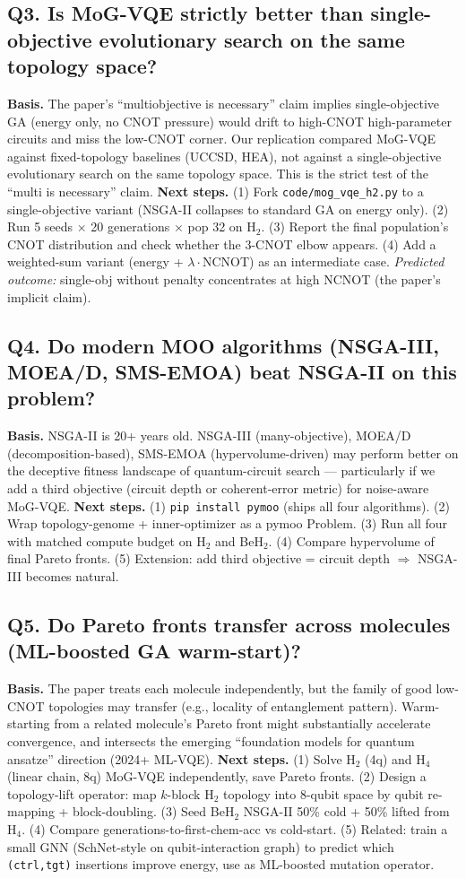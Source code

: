 \subsection*{Q3. Is MoG-VQE strictly better than single-objective evolutionary search on the same topology space?}
\textbf{Basis.} The paper's ``multiobjective is necessary'' claim implies single-objective
GA (energy only, no CNOT pressure) would drift to high-CNOT high-parameter circuits and miss
the low-CNOT corner. Our replication compared MoG-VQE against fixed-topology baselines
(UCCSD, HEA), not against a single-objective evolutionary search on the same topology space.
This is the strict test of the ``multi is necessary'' claim.
\textbf{Next steps.} (1) Fork \texttt{code/mog\_vqe\_h2.py} to a single-objective variant
(NSGA-II collapses to standard GA on energy only). (2) Run 5 seeds $\times$ 20 generations
$\times$ pop 32 on H$_2$. (3) Report the final population's CNOT distribution and check
whether the 3-CNOT elbow appears. (4) Add a weighted-sum variant (energy + $\lambda\cdot$NCNOT)
as an intermediate case. \emph{Predicted outcome:} single-obj without penalty concentrates
at high NCNOT (the paper's implicit claim).

\subsection*{Q4. Do modern MOO algorithms (NSGA-III, MOEA/D, SMS-EMOA) beat NSGA-II on this problem?}
\textbf{Basis.} NSGA-II is 20+ years old. NSGA-III (many-objective), MOEA/D
(decomposition-based), SMS-EMOA (hypervolume-driven) may perform better on the deceptive
fitness landscape of quantum-circuit search --- particularly if we add a third objective
(circuit depth or coherent-error metric) for noise-aware MoG-VQE.
\textbf{Next steps.} (1) \texttt{pip install pymoo} (ships all four algorithms). (2) Wrap
topology-genome + inner-optimizer as a pymoo Problem. (3) Run all four with matched
compute budget on H$_2$ and BeH$_2$. (4) Compare hypervolume of final Pareto fronts.
(5) Extension: add third objective = circuit depth $\Rightarrow$ NSGA-III becomes natural.

\subsection*{Q5. Do Pareto fronts transfer across molecules (ML-boosted GA warm-start)?}
\textbf{Basis.} The paper treats each molecule independently, but the family of good
low-CNOT topologies may transfer (e.g., locality of entanglement pattern). Warm-starting
from a related molecule's Pareto front might substantially accelerate convergence, and
intersects the emerging ``foundation models for quantum ansatze'' direction (2024+ ML-VQE).
\textbf{Next steps.} (1) Solve H$_2$ (4q) and H$_4$ (linear chain, 8q) MoG-VQE independently,
save Pareto fronts. (2) Design a topology-lift operator: map $k$-block H$_2$ topology into
8-qubit space by qubit re-mapping + block-doubling. (3) Seed BeH$_2$ NSGA-II 50\% cold +
50\% lifted from H$_4$. (4) Compare generations-to-first-chem-acc vs cold-start.
(5) Related: train a small GNN (SchNet-style on qubit-interaction graph) to predict
which \texttt{(ctrl,tgt)} insertions improve energy, use as ML-boosted mutation operator.
